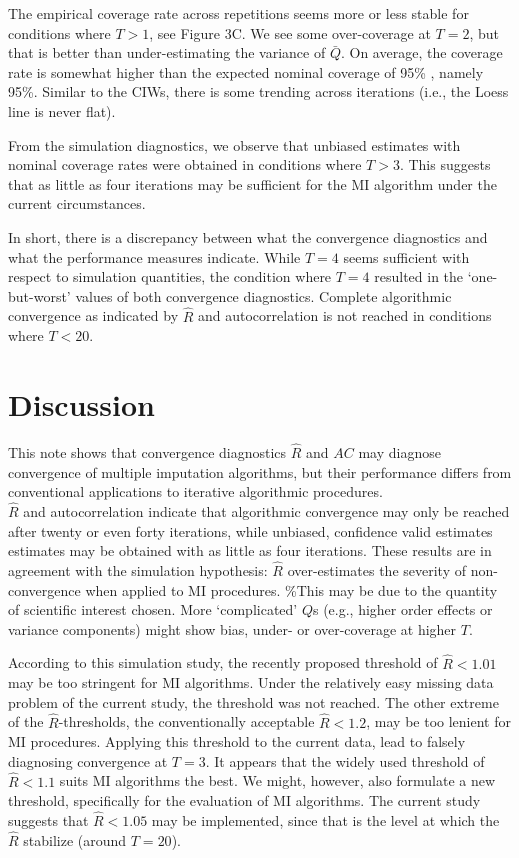 \documentclass[Royal,times,sageh]{sagej}
\begin{document}
The empirical coverage rate across repetitions seems more or less stable
for conditions where \(T>1\), see Figure 3C. We see some over-coverage
at \(T=2\), but that is better than under-estimating the variance of
\(\bar{Q}\). On average, the coverage rate is somewhat higher than the
expected nominal coverage of 95\% \citep{neym34}, namely 95\%. Similar
to the CIWs, there is some trending across iterations (i.e., the Loess
line is never flat).

From the simulation diagnostics, we observe that unbiased estimates with
nominal coverage rates were obtained in conditions where \(T>3\). This
suggests that as little as four iterations may be sufficient for the MI
algorithm under the current circumstances.

In short, there is a discrepancy between what the convergence
diagnostics and what the performance measures indicate. While \(T=4\)
seems sufficient with respect to simulation quantities, the condition
where \(T=4\) resulted in the `one-but-worst' values of both convergence
diagnostics. Complete algorithmic convergence as indicated by
\(\widehat{R}\) and autocorrelation is not reached in conditions where
\(T<20\).

\hypertarget{discussion}{%
\section{Discussion}\label{discussion}}

This note shows that convergence diagnostics \(\widehat{R}\) and \(AC\)
may diagnose convergence of multiple imputation algorithms, but their
performance differs from conventional applications to iterative
algorithmic procedures.\\
\(\widehat{R}\) and autocorrelation indicate that algorithmic
convergence may only be reached after twenty or even forty iterations,
while unbiased, confidence valid estimates estimates may be obtained
with as little as four iterations. These results are in agreement with
the simulation hypothesis: \(\widehat{R}\) over-estimates the severity
of non-convergence when applied to MI procedures. \%This may be due to
the quantity of scientific interest chosen. More `complicated' \(Q\)s
(e.g., higher order effects or variance components) might show bias,
under- or over-coverage at higher \(T\).

According to this simulation study, the recently proposed threshold of
\(\widehat{R}<1.01\) may be too stringent for MI algorithms. Under the
relatively easy missing data problem of the current study, the threshold
was not reached. The other extreme of the \(\widehat{R}\)-thresholds,
the conventionally acceptable \(\widehat{R} <1.2\), may be too lenient
for MI procedures. Applying this threshold to the current data, lead to
falsely diagnosing convergence at \(T = 3\). It appears that the widely
used threshold of \(\widehat{R} < 1.1\) suits MI algorithms the best. We
might, however, also formulate a new threshold, specifically for the
evaluation of MI algorithms. The current study suggests that
\(\widehat{R} < 1.05\) may be implemented, since that is the level at
which the \(\widehat{R}\) stabilize (around \(T = 20\)).
\end{document}

